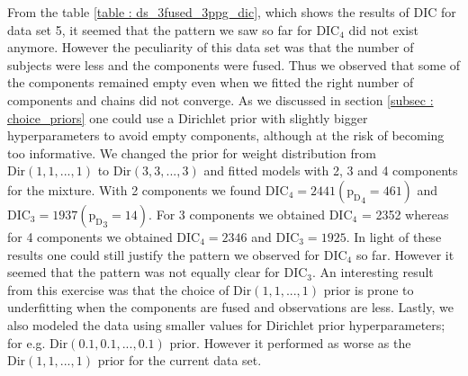 From the table \ref{table : ds_3fused_3ppg_dic}, which shows the results of DIC for data set 5, it seemed that the pattern we saw so far for $\text{DIC}_4$ did not exist anymore. However the peculiarity of this data set was that the number of subjects were less and the components were fused. Thus we observed that some of the components remained empty even when we fitted the right number of components and chains did not converge. As we discussed in section \ref{subsec : choice_priors} one could use a Dirichlet prior with slightly bigger hyperparameters to avoid empty components, although at the risk of becoming too informative. We changed the prior for weight distribution from $\text{Dir}(1, 1, ..., 1)$ to $\text{Dir}(3, 3, ..., 3)$ and fitted models with 2, 3 and 4 components for the mixture. With 2 components we found $\text{DIC}_4 = 2441 ({\text{p}_\text{D}}_4 = 461)$ and $\text{DIC}_3 = 1937 ({\text{p}_\text{D}}_3 = 14)$. For 3 components we obtained $\text{DIC}_4$ = 2352 whereas for 4 components we obtained $\text{DIC}_4 = 2346$ and $\text{DIC}_3 = 1925$. In light of these results one could still justify the pattern we observed for $\text{DIC}_4$ so far. However it seemed that the pattern was not equally clear for $\text{DIC}_3$. An interesting result from this exercise was that the choice of $\text{Dir}(1, 1, ..., 1)$ prior is prone to underfitting when the components are fused and observations are less. Lastly, we also modeled the data using smaller values for Dirichlet prior hyperparameters; for e.g. $\text{Dir}(0.1, 0.1, ..., 0.1)$ prior. However it performed as worse as the $\text{Dir}(1, 1, ..., 1)$ prior for the current data set.\\


